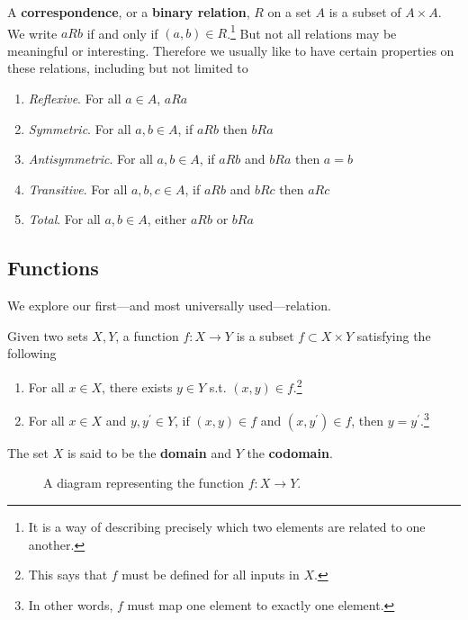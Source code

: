   \begin{definition}
    \label{def:correspondence-relation}
    A \textbf{correspondence}, or a \textbf{binary relation}, $R$ on a set $A$ is a subset of $A \times A$. We write $aRb$ if and only if $(a,b) \in R$.\footnote{It is a way of describing precisely which two elements are related to one another.} But not all relations may be meaningful or interesting. Therefore we usually like to have certain properties on these relations, including but not limited to 
    \begin{enumerate}
      \item \textit{Reflexive}. For all $a \in A$, $aRa$
      \item \textit{Symmetric}. For all $a,b \in A$, if $aRb$ then $bRa$
      \item \textit{Antisymmetric}. For all $a,b \in A$, if $aRb$ and $bRa$ then $a=b$
      \item \textit{Transitive}. For all $a,b,c \in A$, if $aRb$ and $bRc$ then $aRc$
      \item \textit{Total}. For all $a,b \in A$, either $aRb$ or $bRa$
    \end{enumerate}
  \end{definition} 

\subsection{Functions} 

  We explore our first---and most universally used---relation. 

  \begin{definition}[Function]
    \label{def:function}
    Given two sets $X, Y$, a function $f: X \rightarrow Y$ is a subset $f \subset X \times Y$ satisfying the following
    \begin{enumerate}
      \item For all $x \in X$, there exists $y \in Y$ s.t. $(x, y) \in f$.\footnote{This says that $f$ must be defined for all inputs in $X$.}
      \item For all $x \in X$ and $y, y^\prime \in Y$, if $(x, y) \in f$ and $(x, y^\prime) \in f$, then $y = y^\prime$.\footnote{In other words, $f$ must map one element to exactly one element.} 
    \end{enumerate}
    The set $X$ is said to be the \textbf{domain} and $Y$ the \textbf{codomain}. 

    \begin{figure}[H]
      \centering 
      \caption{A diagram representing the function $f: X \rightarrow Y$.} 
      \label{fig:function at}
    \end{figure}
  \end{definition} 


